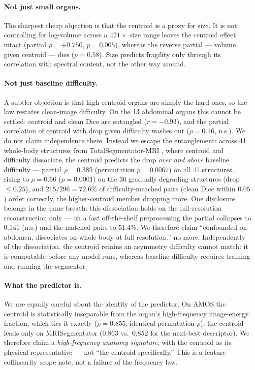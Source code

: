 \documentclass[10pt,twocolumn,letterpaper]{article}
\begin{document}
\paragraph{Not just small organs.}
The sharpest cheap objection is that the centroid is a proxy for size. It is not: controlling for log-volume across a $421\times$ size range leaves the centroid effect intact (partial $\rho = +0.750$, $p=0.005$), whereas the reverse partial --- volume given centroid --- dies ($p=0.58$). Size predicts fragility only through its correlation with spectral content, not the other way around.

\paragraph{Not just baseline difficulty.}
A subtler objection is that high-centroid organs are simply the hard ones, so the law restates clean-image difficulty. On the 13 abdominal organs this cannot be settled: centroid and clean Dice are entangled ($r=-0.93$), and the partial correlation of centroid with drop given difficulty washes out ($\rho=0.16$, n.s.). We do not claim independence there. Instead we escape the entanglement: across 41 whole-body structures from TotalSegmentator-MRI \cite{wasserthal2023totalseg}, where centroid and difficulty dissociate, the centroid predicts the drop \emph{over and above} baseline difficulty --- partial $\rho = 0.389$ (permutation $p=0.0067$) on all 41 structures, rising to $\rho=0.66$ ($p=0.0001$) on the 30 gradually degrading structures (drop $\le 0.25$), and $215/296 = 72.6\%$ of difficulty-matched pairs (clean Dice within $0.05$) order correctly, the higher-centroid member dropping more. One disclosure belongs in the same breath: this dissociation holds on the full-resolution reconstruction only --- on a fast off-the-shelf preprocessing the partial collapses to $0.141$ (n.s.) and the matched pairs to $51.4\%$. We therefore claim ``confounded on abdomen, dissociates on whole-body at full resolution,'' no more. Independently of the dissociation, the centroid retains an asymmetry difficulty cannot match: it is computable before any model runs, whereas baseline difficulty requires training and running the segmenter.

\paragraph{What the predictor is.}
We are equally careful about the identity of the predictor. On AMOS the centroid is statistically inseparable from the organ's high-frequency image-energy fraction, which ties it exactly ($\rho=0.855$, identical permutation $p$); the centroid leads only on MRISegmentator ($0.863$ vs.\ $0.852$ for the next-best descriptor). We therefore claim a \emph{high-frequency anatomy signature}, with the centroid as its physical representative --- not ``the centroid specifically.'' This is a feature-collinearity scope note, not a failure of the frequency law.
\end{document}
